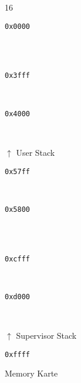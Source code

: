 \documentclass{scrartcl}
\begin{document}
\begin{figure}[h]
	\centering
	\caption{Memory Karte}
	\label{fig:memoryMap}
	\begin{bytefield}[leftcurly=., rightcurly=., leftcurlyspace=0pt, rightcurlyspace=0pt]{16}
		
		\begin{leftwordgroup}{\small \texttt{0x0000}}
		\end{leftwordgroup}\\
		 \\
		\begin{leftwordgroup}{\small \texttt{0x3fff}}
		\end{leftwordgroup}\\

		\begin{leftwordgroup}{\small \texttt{0x4000}}
		\end{leftwordgroup}\\
		\begin{rightwordgroup}{\large $\uparrow$ User Stack}
			 \\
		\end{rightwordgroup}
		\begin{leftwordgroup}{\small \texttt{0x57ff}}
		\end{leftwordgroup}\\

		\begin{leftwordgroup}{\small \texttt{0x5800}}
		\end{leftwordgroup}\\
		 \\
		\begin{leftwordgroup}{\small \texttt{0xcfff}}
		\end{leftwordgroup}\\

		\begin{leftwordgroup}{\small \texttt{0xd000}}
		\end{leftwordgroup}\\
		\begin{rightwordgroup}{\large $\uparrow$ Supervisor Stack}
			 \\
		\end{rightwordgroup}
		\begin{leftwordgroup}{\small \texttt{0xffff}}
		\end{leftwordgroup}

	\end{bytefield}
	
\end{figure}
\end{document}
